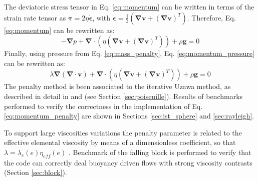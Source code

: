 \documentclass[hidelinks,11pt,a4paper]{article}
\begin{document}
The deviatoric stress tensor in Eq. \ref{eq:momentum} can be written in terms of the strain rate tensor as $\bm{\tau}=2\eta\dot{\bm{\epsilon}}$, with $\dot{\bm{\epsilon}}=\frac{1}{2}\left(\bm{\nabla}\bm{v}+(\bm{\nabla}\bm{v})^T\right)$. Therefore, Eq. \ref{eq:momentum} can be rewritten as:
\begin{equation}\label{eq:momentum_pressure}
-\bm{\nabla} p + \bm{\nabla} \cdot \left(\eta \left(\bm{\nabla}\bm{v}+(\bm{\nabla}\bm{v})^T\right)\right) + \rho \bm{g} = 0
\end{equation}
Finally, using pressure from Eq. \ref{eq:mass_penalty}, Eq. \ref{eq:momentum_pressure} can be rewritten as:
\begin{equation}\label{eq:momentum_penalty}
\lambda \bm{\nabla} \left(\bm{\nabla} \cdot \bm{v} \right) + \bm{\nabla} \cdot \left(\eta \left(\bm{\nabla}\bm{v}+(\bm{\nabla}\bm{v})^T\right)\right) + \rho \bm{g} = 0
\end{equation}
The penalty method is been associated to the iterative Uzawa method, as described in detail in \citet{Dabrowski2008} and \citet{Thieulot2014} (see Section \ref{sec:poiseuille}). Results of benchmarks performed to verify the correctness in the implementation of Eq. \ref{eq:momentum_penalty} are shown in Sections \ref{sec:ist_sphere} and \ref{sec:rayleigh}.

To support large viscosities variations the penalty parameter is related to the effective elemental viscosity by means of a dimensionless coefficient, so that $\lambda=\lambda_e(e)\eta_{eff}(e)$ \citep{Marotta2006,Dabrowski2008,Thieulot2014}. Benchmark of the falling block \citep{Gerya2003a,Gerya2010b,Thieulot2011} is performed to verify that the code can correctly deal buoyancy driven flows with strong viscosity contrasts (Section \ref{sec:block}).
\end{document}
